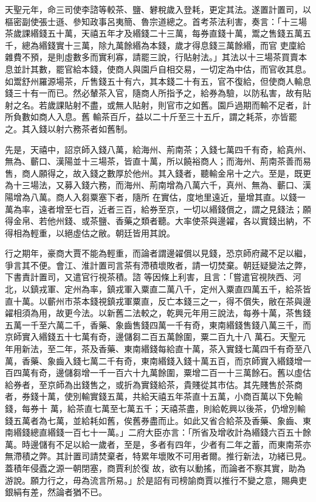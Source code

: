 \begin{pinyinscope}
 天聖元年，命三司使李諮等較茶、鹽、礬稅歲入登耗，更定其法。遂置計置司，以樞密副使張士遜、參知政事呂夷簡、魯宗道總之。首考茶法利害，奏言：「十三場茶歲課緡錢五十萬，天禧五年才及緡錢二十三萬，每券直錢十萬，鬻之售錢五萬五千，總為緡錢實十三萬，除九萬餘緡為本錢，歲才得息錢三萬餘緡，而官
 吏廩給雜費不預，是則虛數多而實利寡，請罷三說，行貼射法。」其法以十三場茶買賣本息並計其數，罷官給本錢，使商人與園戶自相交易，一切定為中估，而官收其息。如鬻舒州羅源場茶，斤售錢五十有六，其本錢二十有五，官不復給，但使商人輸息錢三十有一而已。然必輦茶入官，隨商人所指予之，給券為驗，以防私害，故有貼射之名。若歲課貼射不盡，或無人貼射，則官市之如舊。園戶過期而輸不足者，計所負數如商人入息。舊
 輸茶百斤，益以二十斤至三十五斤，謂之耗茶，亦皆罷之。其入錢以射六務茶者如舊制。



 先是，天禧中，詔京師入錢八萬，給海州、荊南茶；入錢七萬四千有奇，給真州、無為、蘄口、漢陽並十三場茶，皆直十萬，所以饒裕商人；而海州、荊南茶善而易售，商人願得之，故入錢之數厚於他州。其入錢者，聽輸金帛十之六。至是，既更為十三場法，又募入錢六務，而海州、荊南增為八萬六千，真州、無為、蘄口、漢陽增為八萬。商人入芻粟塞下者，隨所
 在實估，度地里遠近，量增其直。以錢一萬為率，遠者增至七百，近者三百，給券至京，一切以緡錢償之，謂之見錢法；願得金帛、若他州錢、或茶鹽、香藥之類者聽。大率使茶與邊糴，各以實錢出納，不得相為輕重，以絕虛估之敝。朝廷皆用其說。



 行之期年，豪商大賈不能為輕重，而論者謂邊糴償以見錢，恐京師府藏不足以繼，爭言其不便。會江、淮計置司言茶有滯積壞敗者，請一切焚棄。朝廷疑變法之弊，下書責計置司，又遣官行視茶積。諮
 等因條上利害，且言：「嘗遣官視陜西、河北，以鎮戎軍、定州為率，鎮戎軍入粟直二萬八千，定州入粟直四萬五千，給茶皆直十萬。以蘄州市茶本錢視鎮戎軍粟直，反亡本錢三之一，得不償失，敝在茶與邊糴相須為用，故更今法。以新舊二法較之，乾興元年用三說法，每券十萬，茶售錢五萬一千至六萬二千，香藥、象齒售錢四萬一千有奇，東南緡錢售錢八萬三千，而京師實入緡錢五十七萬有奇，邊儲芻二百五萬餘圍，粟二百九十八
 萬石。天聖元年用新法，至二年，茶及香藥、東南緡錢每給直十萬，茶入實錢七萬四千有奇至八萬，香藥、象齒入錢七萬二千有奇，東南緡錢入錢十萬五百，而京師實入緡錢增一百四萬有奇，邊儲芻增一千一百六十九萬餘圍，粟增二百一十三萬餘石。舊以虛估給券者，至京師為出錢售之，或折為實錢給茶，貴賤從其市估。其先賤售於茶商者，券錢十萬，使別輸實錢五萬，共給天禧五年茶直十五萬，小商百萬以下免輸錢，每券十
 萬，給茶直七萬至七萬五千；天禧茶盡，則給乾興以後茶，仍增別輸錢五萬者為七萬，並給耗如舊，俟舊券盡而止。如此又省合給茶及香藥、象齒、東南緡錢總直緡錢一百七十一萬。」二府大臣亦言：「所省及增收計為緡錢六百五十餘萬。時邊儲有不足以給一歲者，至是，多者有四年，少者有二年之蓄，而東南茶亦無滯積之弊。其計置司請焚棄者，特累年壞敗不可用者爾。推行新法，功緒已見。蓋積年侵蠹之源一朝閉塞，商賈利於復
 故，欲有以動搖，而論者不察其實，助為游說。願力行之，毋為流言所易。」於是詔有司榜諭商賈以推行不變之意，賜典吏銀絹有差，然論者猶不已。



\end{pinyinscope}